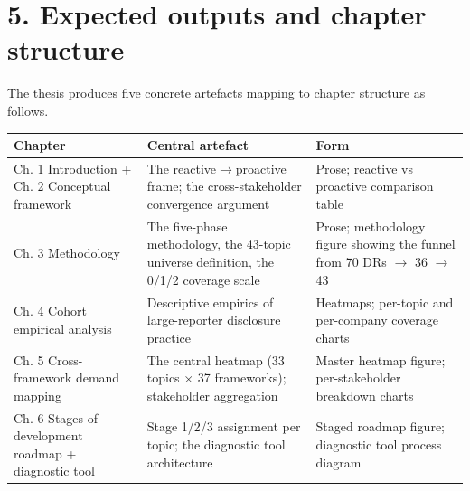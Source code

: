 \documentclass[
]{article}
\newcounter{none} %
\begin{document}
\iffalse %
\section{5. Expected outputs and chapter
structure}\label{expected-outputs-and-chapter-structure}

The thesis produces five concrete artefacts mapping to chapter structure
as follows.

{\def\LTcaptype{none} %
\begin{longtable}[]{@{}
  >{\raggedright\arraybackslash}p{}
  >{\raggedright\arraybackslash}p{}
  >{\raggedright\arraybackslash}p{}@{}}
\toprule\noalign{}
\begin{minipage}[b]{\linewidth}\raggedright
\textbf{Chapter}
\end{minipage} & \begin{minipage}[b]{\linewidth}\raggedright
\textbf{Central artefact}
\end{minipage} & \begin{minipage}[b]{\linewidth}\raggedright
\textbf{Form}
\end{minipage} \\
\midrule\noalign{}
\endhead
\bottomrule\noalign{}
\endlastfoot
Ch. 1 Introduction + Ch. 2 Conceptual framework & The reactive$\to$proactive
frame; the cross-stakeholder convergence argument & Prose; reactive vs
proactive comparison table \\
Ch. 3 Methodology & The five-phase methodology, the 43-topic universe
definition, the 0/1/2 coverage scale & Prose; methodology figure showing
the funnel from 70 DRs $\to$ 36 $\to$ 43 \\
Ch. 4 Cohort empirical analysis & Descriptive empirics of large-reporter
disclosure practice & Heatmaps; per-topic and per-company coverage
charts \\
Ch. 5 Cross-framework demand mapping & The central heatmap (33 topics $\times$
37 frameworks); stakeholder aggregation & Master heatmap figure;
per-stakeholder breakdown charts \\
Ch. 6 Stages-of-development roadmap + diagnostic tool & Stage 1/2/3
assignment per topic; the diagnostic tool architecture & Staged roadmap
figure; diagnostic tool process diagram \\

\end{longtable}}
\end{document}
